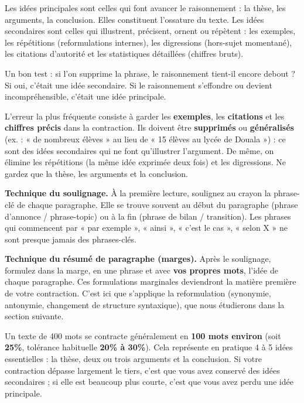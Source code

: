 \documentclass[11pt]{article}
\newcommand{\cle}[1]{{\popxbold\color{popdark}#1}}
\begin{document}
\begin{definition}
Les \cle{idées principales} sont celles qui font avancer le raisonnement : la thèse, les arguments, la conclusion. Elles constituent l'\cle{ossature} du texte.
Les \cle{idées secondaires} sont celles qui illustrent, précisent, ornent ou répètent : les \cle{exemples}, les \cle{répétitions} (reformulations internes), les \cle{digressions} (hors-sujet momentané), les \cle{citations} d'autorité et les \cle{statistiques détaillées} (chiffres bruts).
\end{definition}

Un bon test : si l'on supprime la phrase, le raisonnement tient-il encore debout ? Si oui, c'était une idée secondaire. Si le raisonnement s'effondre ou devient incompréhensible, c'était une idée principale.

\begin{attention}
L'erreur la plus fréquente consiste à garder les \textbf{exemples}, les \textbf{citations} et les \textbf{chiffres précis} dans la contraction. Ils doivent être \textbf{supprimés} ou \textbf{généralisés} (ex. : « de nombreux élèves » au lieu de « 15 élèves au lycée de Douala ») : ce sont des idées secondaires qui ne font qu'illustrer l'argument. De même, on élimine les répétitions (la même idée exprimée deux fois) et les digressions. Ne gardez que la thèse, les arguments et la conclusion.
\end{attention}

\textbf{Technique du soulignage.} À la première lecture, soulignez au crayon la phrase-clé de chaque paragraphe. Elle se trouve souvent au début du paragraphe (phrase d'annonce / phrase-topic) ou à la fin (phrase de bilan / transition). Les phrases qui commencent par « par exemple », « ainsi », « c'est le cas », « selon X » ne sont presque jamais des phrases-clés.

\textbf{Technique du résumé de paragraphe (marges).} Après le soulignage, formulez dans la marge, en une phrase et avec \textbf{vos propres mots}, l'idée de chaque paragraphe. Ces formulations marginales deviendront la matière première de votre contraction. C'est ici que s'applique la \cle{reformulation} (synonymie, antonymie, changement de structure syntaxique), que nous étudierons dans la section suivante.

\begin{exemplebox}
Un texte de 400 mots se contracte généralement en \textbf{100 mots environ} (soit \textbf{25\%}, tolérance habituelle \textbf{20\% à 30\%}). Cela représente en pratique 4 à 5 idées essentielles : la thèse, deux ou trois arguments et la conclusion. Si votre contraction dépasse largement le tiers, c'est que vous avez conservé des idées secondaires ; si elle est beaucoup plus courte, c'est que vous avez perdu une idée principale.
\end{exemplebox}
\end{document}
